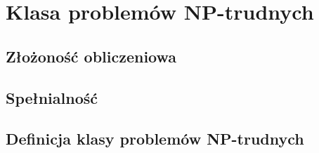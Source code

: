 \chapter{Klasa problemów NP-trudnych}

\section{Złożoność obliczeniowa}

\section{Spełnialność}

\section{Definicja klasy problemów NP-trudnych}



